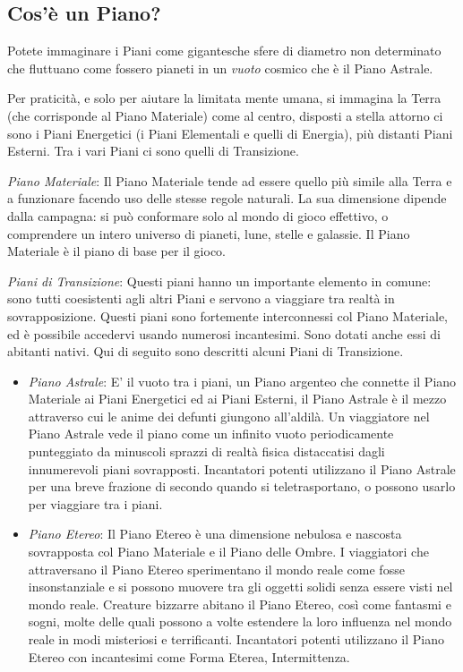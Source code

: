 \documentclass[a4paper,twoside,openany]{book}
\begin{document}
\begin{multicols}{2}

\subsection{Cos'è un Piano?}

Potete immaginare i Piani come gigantesche sfere di diametro non determinato che fluttuano come fossero pianeti in un \emph{vuoto} cosmico che è il Piano Astrale.

Per praticità, e solo per aiutare la limitata mente umana, si immagina la Terra (che corrisponde al Piano Materiale) come al centro, disposti a stella attorno ci sono i Piani Energetici (i Piani Elementali e quelli di Energia), più distanti Piani Esterni. Tra i vari Piani ci sono quelli di Transizione.

\emph{Piano Materiale}: Il Piano Materiale tende ad essere quello più simile alla Terra e a funzionare facendo uso delle stesse regole naturali. La sua dimensione dipende dalla campagna: si può conformare solo al mondo di gioco effettivo, o comprendere un intero universo di pianeti, lune, stelle e galassie. Il Piano Materiale è il piano di base per il gioco.

\emph{Piani di Transizione}: Questi piani hanno un importante elemento in comune: sono tutti coesistenti agli altri Piani e servono a viaggiare tra realtà in sovrapposizione. Questi piani sono fortemente interconnessi col Piano Materiale, ed è possibile accedervi usando numerosi incantesimi. Sono dotati anche essi di abitanti nativi. Qui di seguito sono descritti alcuni Piani di Transizione.

\begin{itemize}[leftmargin=*] \setlength{\itemsep}{0pt}
	\item
	\emph{Piano Astrale}: E' il vuoto tra i piani, un Piano argenteo che connette il Piano Materiale ai Piani Energetici ed ai Piani Esterni, il Piano Astrale è il mezzo attraverso cui le anime dei defunti giungono all'aldilà. Un viaggiatore nel Piano Astrale vede il piano come un infinito vuoto periodicamente punteggiato da minuscoli sprazzi di realtà fisica distaccatisi dagli innumerevoli piani sovrapposti. Incantatori potenti utilizzano il Piano Astrale per una breve frazione di secondo quando si teletrasportano, o possono usarlo per viaggiare tra i piani.

	\item
	\emph{Piano Etereo}: Il Piano Etereo è una dimensione nebulosa e nascosta sovrapposta col Piano Materiale e il Piano delle Ombre. I viaggiatori che attraversano il Piano Etereo sperimentano il mondo reale come fosse insonstanziale e si possono muovere tra gli oggetti solidi senza essere visti nel mondo reale. Creature bizzarre abitano il Piano Etereo, così come fantasmi e sogni, molte delle quali possono a volte estendere la loro influenza nel mondo reale in modi misteriosi e terrificanti. Incantatori potenti utilizzano il Piano Etereo con incantesimi come Forma Eterea, Intermittenza.


\end{itemize}
\end{multicols}
\end{document}
